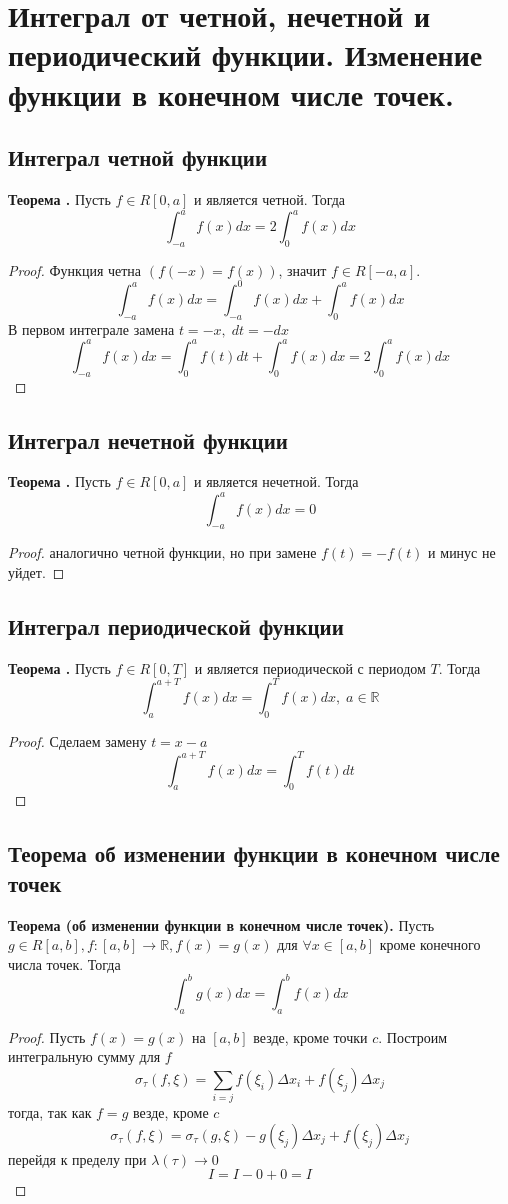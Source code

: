 \documentclass{article}
\newcommand*{\theorem}[2]{\textbf{Теорема #1. } #2 \newline}
\newcommand*{\R}{\mathbb{R}}
\newcommand*{\D}{\Delta}
\begin{document}
\section{Интеграл от четной, нечетной и периодический функции. Изменение функции в конечном числе точек.}
\subsection{Интеграл четной функции}
\theorem{}{Пусть $f \in R[0, a]$ и является четной. Тогда}
$$
    \int_{-a}^{a} f(x)dx = 2\int_{0}^{a} f(x)dx
$$
\begin{proof}
    Функция четна $(f(-x) = f(x))$, значит $f \in R[-a, a]$.
    $$
        \int_{-a}^{a}f(x)dx = \int_{-a}^{0}f(x)dx + \int_{0}^{a}f(x)dx 
    $$
    В первом интеграле замена $t = -x, \; dt = -dx$
    $$
        \int_{-a}^{a} f(x)dx = \int_{0}^{a} f(t)dt + \int_{0}^{a}f(x)dx = 2\int_{0}^{a} f(x)dx 
    $$
\end{proof}
\subsection{Интеграл нечетной функции}
\theorem{}{Пусть $f \in R[0, a]$ и является нечетной. Тогда}
$$
    \int_{-a}^{a}f(x)dx = 0
$$  
\begin{proof}
    аналогично четной функции, но при замене $f(t) = -f(t)$ и минус не уйдет.
\end{proof}
\subsection{Интеграл периодической функции}
\theorem{}{Пусть $f \in R[0, T]$ и является периодической с периодом $T$. Тогда}
$$
    \int_{a}^{a + T} f(x)dx = \int_{0}^{T}f(x)dx, \; a \in \R
$$
\begin{proof}
    Сделаем замену $t = x - a$
    $$
        \int_{a}^{a + T} f(x)dx = \int_{0}^{T} f(t)dt
    $$
\end{proof}
\subsection{Теорема об изменении функции в конечном числе точек}
\theorem{(об изменении функции в конечном числе точек)}{Пусть $g \in R[a, b], f: [a, b] \to \R, f(x) = g(x)$ для $\forall x \in [a, b]$ кроме конечного числа точек. Тогда }
$$
    \int_{a}^{b}g(x)dx = \int_{a}^{b}f(x)dx
$$
\begin{proof}
    Пусть $f(x) = g(x)$ на $[a, b]$ везде, кроме точки $c$. Построим интегральную сумму для $f$
    $$
        \sigma_\tau (f, \xi) = \sum_{i = j}^{} f(\xi_i)\D x_i + f(\xi_j)\D x_j
    $$
    тогда, так как $f = g$ везде, кроме $c$
    $$
        \sigma_\tau(f, \xi) = \sigma_\tau(g, \xi) - g(\xi_j)\D x_j + f(\xi_j)\D x_j
    $$
    перейдя к пределу при $\lambda(\tau) \to 0$
    $$
        I = I - 0 + 0 = I
    $$
\end{proof}
\end{document}
